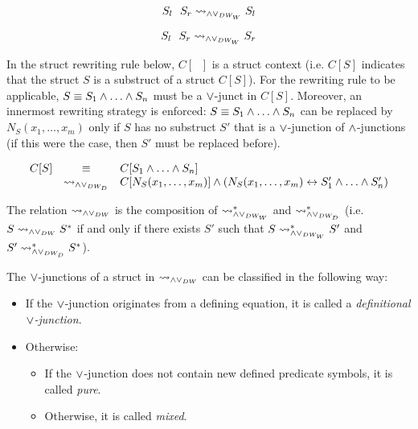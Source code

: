 \begin{definition}[$\normalizePlusTimesDW$]
\begin{multicols}{4}
{$$
S_l \hF{\structplus} S_r \normalizePlusTimesDWw  S_l
$$

$$
S_l \hF{\structplus} S_r \normalizePlusTimesDWw  S_r
$$

}\end{multicols}

In the struct rewriting rule below, $C[\phantom{S}]$ is a struct context (i.e. $C[S]$ indicates that the struct $S$ is a substruct of a struct $C[S]$). For the rewriting rule to be applicable, $S \equiv S_1 \wedge \ldots \wedge S_n$ must be a $\vee$-junct in $C[S]$. Moreover, an innermost rewriting strategy is enforced: $S \equiv S_1 \wedge \ldots \wedge S_n$ can be replaced by $N_{S}(x_1,\ldots, x_m)$ only if $S$ has no substruct $S'$ that is a $\vee$-junction of $\wedge$-junctions (if this were the case, then $S'$ must be replaced before).


$$
\begin{array}{rcl}
C[S]  & \equiv & C[S_1 \wedge \ldots \wedge S_n] \\ 
		& \leadsto_{\wedge\vee_{DW_D}} & 
C[N_{S}(x_1,\ldots, x_m)] \wedge (N_{S}(x_1,\ldots, x_m) \leftrightarrow S'_1 \wedge \ldots \wedge S'_n)
\end{array}
$$

\medskip

The relation $\normalizePlusTimesDW$ is the composition of $\leadsto_{\wedge\vee_{DW_W}}^*$ and $\leadsto_{\wedge\vee_{DW_D}}^*$ (i.e. $S \leadsto_{\wedge\vee_{DW}} S^*$ if and only if there exists $S'$ such that $S \leadsto_{\wedge\vee_{DW_W}}^* S'$ and $S' \leadsto_{\wedge\vee_{DW_D}}^* S^*$).

The $\vee$-junctions of a struct in $\normalizePlusTimesDW$ can be classified in the following way:
\begin{itemize}
	\item If the $\vee$-junction originates from a defining equation, it is called a \emph{definitional $\vee$-junction}.

	\item Otherwise:
		\begin{itemize}
			\item If the $\vee$-junction does not contain new defined predicate symbols, it is called \emph{pure}.

			\item Otherwise, it is called \emph{mixed}.
		\end{itemize}

\end{itemize}

\end{definition}


